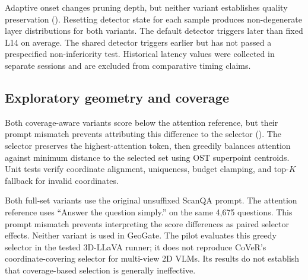Adaptive onset changes pruning depth, but neither variant establishes quality preservation (). Resetting detector state for each sample produces non-degenerate layer distributions for both variants. The default detector triggers later than fixed L14 on average. The shared detector triggers earlier but has not passed a prespecified non-inferiority test. Historical latency values were collected in separate sessions and are excluded from comparative timing claims.

\begin{table}[t]
\centering
\caption{Corrected adaptive-onset evaluation on LLaVA-3D ScanQA.}
\label{tab:supp_adaptive}
\end{table}

\subsection{Exploratory geometry and coverage}
Both coverage-aware variants score below the attention reference, but their prompt mismatch prevents attributing this difference to the selector (). The selector preserves the highest-attention token, then greedily balances attention against minimum distance to the selected set using OST superpoint centroids. Unit tests verify coordinate alignment, uniqueness, budget clamping, and top-$K$ fallback for invalid coordinates.

Both full-set variants use the original unsuffixed ScanQA prompt. The attention reference uses ``Answer the question simply.'' on the same 4,675 questions. This prompt mismatch prevents interpreting the score differences as paired selector effects. Neither variant is used in GeoGate. The pilot evaluates this greedy selector in the tested 3D-LLaVA runner; it does not reproduce CoVeR's coordinate-covering selector for multi-view 2D VLMs. Its results do not establish that coverage-based selection is generally ineffective.

\begin{table}[t]
\centering
\caption{Unmatched-prompt coverage pilot on 3D-LLaVA ScanQA.}
\label{tab:supp_coverage}
\end{table}

